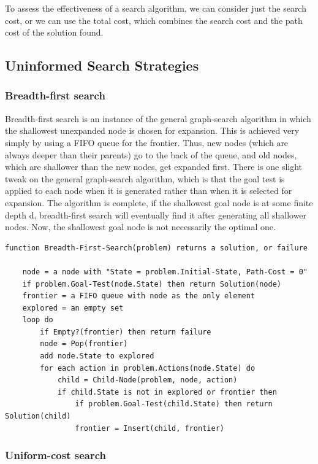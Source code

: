 \documentclass{article}
\begin{document}
To assess the effectiveness of a search algorithm, we can consider just the search cost, or we can use the total cost, which combines the search cost and the path cost of the solution found.

\subsection{Uninformed Search Strategies}

\subsubsection{Breadth-first search}

Breadth-first search is an instance of the general graph-search algorithm in which the shallowest unexpanded node is chosen for expansion. This is achieved very simply by using a FIFO queue for the frontier. Thus, new nodes (which are always deeper than their parents) go to the back of the queue, and old nodes, which are shallower than the new nodes, get expanded first. There is one slight tweak on the general graph-search algorithm, which is that the goal test is applied to each node when it is generated rather than when it is selected for expansion. The algorithm is complete, if the shallowest goal node is at some finite depth d, breadth-first search will eventually find it after generating all shallower nodes. Now, the shallowest goal node is not necessarily the optimal one.

\begin{lstlisting}[caption = Breadth-first search on a graph]
function Breadth-First-Search(problem) returns a solution, or failure

    node = a node with "State = problem.Initial-State, Path-Cost = 0"
    if problem.Goal-Test(node.State) then return Solution(node)
    frontier = a FIFO queue with node as the only element
    explored = an empty set
    loop do
        if Empty?(frontier) then return failure
        node = Pop(frontier)
        add node.State to explored
        for each action in problem.Actions(node.State) do 
            child = Child-Node(problem, node, action)
            if child.State is not in explored or frontier then 
                if problem.Goal-Test(child.State) then return Solution(child)
                frontier = Insert(child, frontier)
\end{lstlisting}

\subsubsection{Uniform-cost search}
\end{document}
